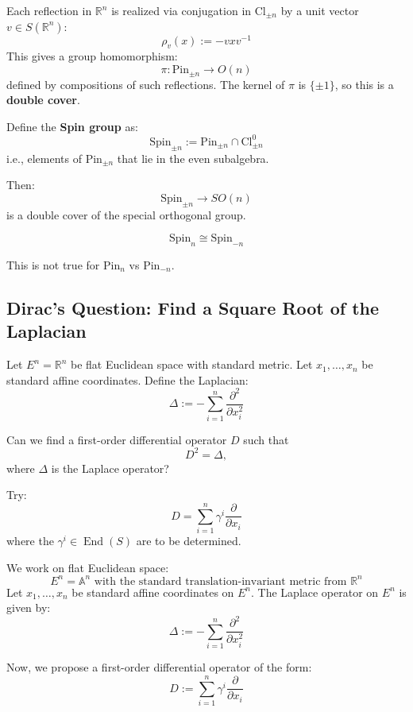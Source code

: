  Each reflection in $\mathbb{R}^n$ is realized via conjugation in $\mathrm{Cl}_{\pm n}$ by a unit vector $v \in S(\mathbb{R}^n)$:
    \[
    \rho_v(x) := -v x v^{-1}
    \]
 This gives a group homomorphism:
    \[
    \pi: \mathrm{Pin}_{\pm n} \longrightarrow O(n)
    \]
    defined by compositions of such reflections.
The kernel of $\pi$ is $\{ \pm 1 \}$, so this is a \textbf{double cover}.

Define the \textbf{Spin group} as:
    \[
    \mathrm{Spin}_{\pm n} := \mathrm{Pin}_{\pm n} \cap \mathrm{Cl}^0_{\pm n}
    \]
    i.e., elements of $\mathrm{Pin}_{\pm n}$ that lie in the even subalgebra.

 Then:
    \[
    \mathrm{Spin}_{\pm n} \to SO(n)
    \]
    is a double cover of the special orthogonal group.

\begin{proposition}
    \[
    \mathrm{Spin}_n \cong \mathrm{Spin}_{-n}
    \]
\end{proposition}

This is not true for $\mathrm{Pin}_n$ vs $\mathrm{Pin}_{-n}$.

\subsection{Dirac's Question: Find a Square Root of the Laplacian}

 Let $E^n = \mathbb{R}^n$ be flat Euclidean space with standard metric. Let $x_1, \dots, x_n$ be standard affine coordinates. Define the Laplacian:
    \[
    \Delta := -\sum_{i=1}^n \frac{\partial^2}{\partial x_i^2}
    \]
\begin{problem}[Dirac]
    Can we find a first-order differential operator $D$ such that
\[
D^2 = \Delta,
\]
where $\Delta$ is the Laplace operator?
\end{problem}
Try:
    \[
    D = \sum_{i=1}^n \gamma^i \frac{\partial}{\partial x_i}
    \]
where the $\gamma^i \in \operatorname{End}(S)$ are to be determined.

We work on flat Euclidean space:
\[
E^n = \mathbb{A}^n \text{ with the standard translation-invariant metric from } \mathbb{R}^n
\]
Let $x_1, \dots, x_n$ be standard affine coordinates on $E^n$. The Laplace operator on $E^n$ is given by:
    \begin{equation}
    \Delta := -\sum_{i=1}^n \frac{\partial^2}{\partial x_i^2} 
    \end{equation}

Now, we propose a first-order differential operator of the form:
    \begin{equation}
    D := \sum_{i=1}^n \gamma^i \frac{\partial}{\partial x_i} 
    \end{equation}

